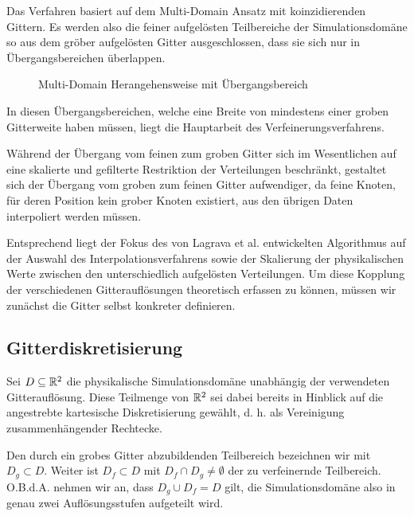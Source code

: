 Das Verfahren basiert auf dem Multi-Domain Ansatz \cite[Kap.~3.1]{Lagrava12} mit koinzidierenden Gittern. Es werden also die feiner aufgelösten Teilbereiche der Simulationsdomäne so aus dem gröber aufgelösten Gitter ausgeschlossen, dass sie sich nur in Übergangsbereichen überlappen.

\begin{figure}[h]
\centering

\caption{Multi-Domain Herangehensweise mit Übergangsbereich \cite[vgl.~Abb.~3]{Lagrava12}}
\label{fig:MultiDomainOverlap}
\end{figure}

\noindent
In diesen Übergangsbereichen, welche eine Breite von mindestens einer groben Gitterweite haben müssen, liegt die Hauptarbeit des Verfeinerungsverfahrens.

\bigskip
Während der Übergang vom feinen zum groben Gitter sich im Wesentlichen auf eine skalierte und gefilterte Restriktion der Verteilungen beschränkt, gestaltet sich der Übergang vom groben zum feinen Gitter aufwendiger, da feine Knoten, für deren Position kein grober Knoten existiert, aus den übrigen Daten interpoliert werden müssen.

Entsprechend liegt der Fokus des von Lagrava et al. entwickelten Algorithmus auf der Auswahl des Interpolationsverfahrens sowie der Skalierung der physikalischen Werte zwischen den unterschiedlich aufgelösten Verteilungen. Um diese Kopplung der verschiedenen Gitterauflösungen theoretisch erfassen zu können, müssen wir zunächst die Gitter selbst konkreter definieren.

\newpage
\subsection{Gitterdiskretisierung}

\begin{Definition}
\label{def:SimDomain}
Sei \(D \subseteq \mathbb{R}^2\) die physikalische Simulationsdomäne unabhängig der verwendeten Gitterauflösung. Diese Teilmenge von \(\mathbb{R}^2\) sei dabei bereits in Hinblick auf die angestrebte kartesische Diskretisierung gewählt, d. h. als Vereinigung zusammenhängender Rechtecke.

Den durch ein grobes Gitter abzubildenden Teilbereich bezeichnen wir mit \(D_g \subset D\). Weiter ist \(D_f \subset D\) mit \(D_f \cap D_g \neq \emptyset\) der zu verfeinernde Teilbereich. O.B.d.A. nehmen wir an, dass \(D_g \cup D_f = D\) gilt, die Simulationsdomäne also in genau zwei Auflösungsstufen aufgeteilt wird.
\end{Definition}

